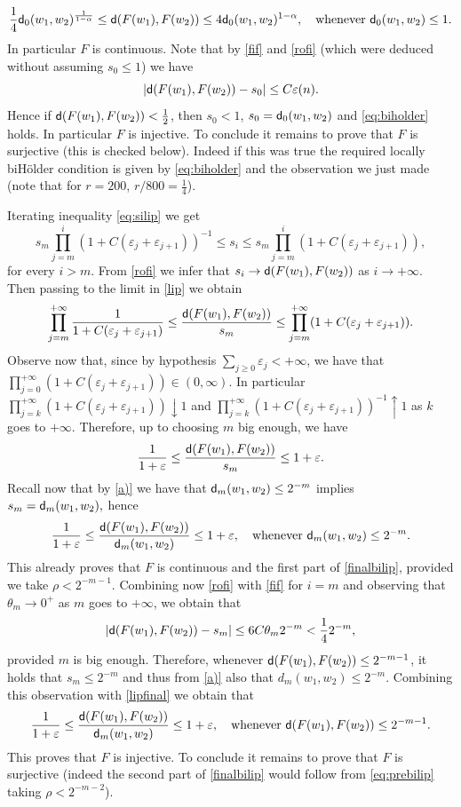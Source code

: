 \documentclass[11pt]{article}
\newcommand{\eps}{\varepsilon}
\newcommand{\sfd}{{\sf d}}
\theoremstyle{plain}
\theoremstyle{definition}
\numberwithin{equation}{section}
\begin{document}
\begin{equation}\label{eq:biholder}
    \frac14 \sfd_0(w_1,w_2)^\frac{1}{1-\alpha}\le \sfd(F(w_1),F(w_2))\le 4\sfd_0(w_1,w_2)^{1-\alpha}, \quad \text{whenever $\sfd_0(w_1,w_2)\le 1$}.
\end{equation}
In particular $F$ is continuous.
Note that by \eqref{fif} and \eqref{rofi} (which were deduced without assuming $s_0\le 1$) we have 
$$|\sfd(F(w_1),F(w_2))-s_0|\le C \eps(n).$$
Hence if $\sfd(F(w_1),F(w_2))<\frac12$, then $s_0<1$, $s_0=\sfd_0(w_1,w_2)$ and \eqref{eq:biholder} holds. In particular $F$ is injective. To conclude it remains to prove that $F$ is surjective (this is checked below). Indeed if this was true the required locally biH\"older condition is given by \eqref{eq:biholder} and the observation we just made (note that for $r=200$, $r/800=\frac14$).

 Iterating inequality \eqref{eq:silip} we get
\begin{equation}	\label{lip}
	s_m\prod_{j=m}^i(1+C(\eps_j+\eps_{j+1}))^{-1}\le s_{i}\le s_{m} \prod_{j=m}^i(1+C(\eps_j+\eps_{j+1})),
\end{equation} 
for every $i>m.$ From \eqref{rofi} we infer that $s_i \to \sfd(F(w_1),F(w_2))$ as $i \to +\infty.$ Then passing to the limit in \eqref{lip} we obtain
\[\prod_{j=m}^{+\infty }\frac{1}{1+C(\eps_j+\eps_{j+1})}\le \frac{\sfd(F(w_1),F(w_2))}{s_m}\le \prod_{j=m}^{+\infty }(1+C(\eps_j+\eps_{j+1})).\]
Observe now that, since by hypothesis $\sum_{j\ge 0}\eps_j <+\infty $, we have that $\prod_{j=0}^{+\infty }(1+C(\eps_j+\eps_{j+1}))\in(0,\infty)$. In particular $\prod_{j=k}^{+\infty }(1+C(\eps_j+\eps_{j+1})) \downarrow 1$ and $\prod_{j=k}^{+\infty }(1+C(\eps_j+\eps_{j+1}))^{-1} \uparrow 1$ as $k$ goes to $+\infty.$ Therefore, up to choosing $m$ big enough, we have
\[\frac{1}{1+\eps}\le \frac{\sfd(F(w_1),F(w_2))}{s_m}\le 1+\eps.\]
Recall now that by \ref{a)} we have that $\sfd_m(w_1,w_2)\le 2^{-m}$ implies $s_m=\sfd_m(w_1,w_2),$   hence 
\begin{equation}	\label{lipfinal}
	\frac{1}{1+\eps}\le \frac{\sfd(F(w_1),F(w_2))}{\sfd_m(w_1,w_2)}\le 1+\eps, \quad \text{whenever $\sfd_m(w_1,w_2)\le 2^{-m}.$}
\end{equation}
This already proves that $F$ is continuous and the first part of \eqref{finalbilip}, provided we take $\rho<2^{-m-1}.$ Combining now \eqref{rofi} with \eqref{fif} for $i=m$ and observing that $\theta_m \to 0^+$ as $m$ goes to $+\infty$, we obtain that
\[ |\sfd(F(w_1),F(w_2))-s_m|\le 6C\theta_m2^{-m}<\frac{1}{4}2^{-m},\]
provided $m$ is big enough. Therefore, whenever $\sfd(F(w_1),F(w_2))\le 2^{-m-1}$, it holds that $s_m\le 2^{-m}$ and thus from \ref{a)} also that $d_m(w_1,w_2)\le 2^{-m}.$ Combining this observation with \eqref{lipfinal} we obtain that
\begin{equation}\label{eq:prebilip}
\frac{1}{1+\eps}\le \frac{\sfd(F(w_1),F(w_2))}{\sfd_m(w_1,w_2)}\le 1+\eps, \quad \text{whenever $\sfd(F(w_1),F(w_2))\le 2^{-m-1}.$}
\end{equation}
 This proves that $F$ is injective. To conclude it remains to prove that $F$ is surjective (indeed the second part of \eqref{finalbilip} would follow from \eqref{eq:prebilip} taking $\rho<2^{-m-2}$). 
\end{document}
